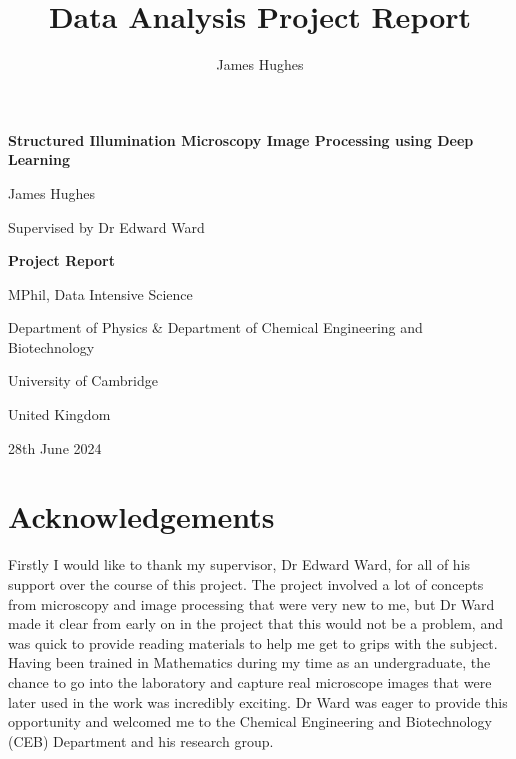 \documentclass[12pt]{article}
\title{Data Analysis Project Report}
\author{James Hughes}
\begin{document}
\begin{titlepage}
    \begin{center}
        \vspace*{1cm}

        \Huge
        \textbf{Structured Illumination Microscopy Image Processing using Deep Learning}

        \vspace{0.5cm}
        \LARGE

        James Hughes

        Supervised by Dr Edward Ward

        \vspace{2cm}
        \Huge
        \textbf{Project Report}

        \vfill

        MPhil, Data Intensive Science

        \vspace{0.8cm}

        \Large
        Department of Physics \& Department of Chemical Engineering and Biotechnology

        University of Cambridge

        United Kingdom

        28th June 2024

    \end{center}
\end{titlepage}


\newpage
\section*{Acknowledgements}

Firstly I would like to thank my supervisor, Dr Edward Ward, for all of his support over the course of this project.
The project involved a lot of concepts from microscopy and image processing that were very new to me,
but Dr Ward made it clear from early on in the project that this would not be a problem,
and was quick to provide reading materials to help me get to grips with the subject.
Having been trained in Mathematics during my time as an undergraduate,
the chance to go into the laboratory and capture real microscope images that were later used in the work was incredibly exciting.
Dr Ward was eager to provide this opportunity and welcomed me to the Chemical Engineering and Biotechnology (CEB) Department and his research group.
\end{document}
